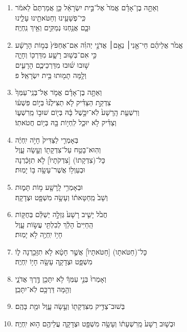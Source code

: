 \documentclass[12pt,a4paper,titlepage]{article}
\def \pslabelsep{-0.9em} %
\def \psleftmargin{0em} %
\begin{document}
\begin{enumerate}[leftmargin=\psleftmargin, labelsep = \pslabelsep, label={\arabic*}, font=\color{\pscolor}\small\textsuperscript, parsep=0em, itemsep=0em, topsep=0em ]
\item \texthebrew{וְאַתָּ֣ה בֶן־אָדָ֗ם אֱמֹר֙ אֶל־בֵּ֣ית יִשְׂרָאֵ֔ל כֵּ֤ן אֲמַרְתֶּם֙ לֵאמֹ֔ר \\ כִּֽי־פְשָׁעֵ֥ינוּ וְחַטֹּאתֵ֖ינוּ עָלֵ֑ינוּ \\ וּבָ֛ם אֲנַ֥חְנוּ נְמַקִּ֖ים וְאֵ֥יךְ נִֽחְיֶֽה׃}
\item \texthebrew{אֱמֹ֙ר אֲלֵיהֶ֜ם חַי־אָ֣נִי׀ נְאֻ֣ם׀ אֲדֹנָ֣י יְהוִ֗ה אִם־אֶחְפֹּץ֙ בְּמ֣וֹת הָרָשָׁ֔ע \\ כִּ֣י אִם־בְּשׁ֥וּב רָשָׁ֛ע מִדַּרְכּ֖וֹ וְחָיָ֑ה \\ שׁ֣וּבוּ שׁ֜וּבוּ מִדַּרְכֵיכֶ֧ם הָרָעִ֛ים \\ וְלָ֥מָּה תָמ֖וּתוּ בֵּ֥ית יִשְׂרָאֵֽל׃ פ}
\item \texthebrew{וְאַתָּ֣ה בֶן־אָדָ֗ם אֱמֹ֤ר אֶל־בְּנֵֽי־עַמְּךָ֙ \\ צִדְקַ֣ת הַצַּדִּ֗יק לֹ֤א תַצִּילֶ֙נּוּ֙ בְּי֣וֹם פִּשְׁע֔וֹ \\ וְרִשְׁעַ֤ת הָֽרָשָׁע֙ לֹֽא־יִכָּ֣שֶׁל בָּ֔הּ בְּי֖וֹם שׁוּב֣וֹ מֵֽרִשְׁע֑וֹ \\ וְצַדִּ֗יק לֹ֥א יוּכַ֛ל לִֽחְי֥וֹת בָּ֖הּ בְּי֥וֹם חֲטֹאתֽוֹ׃}
\item \texthebrew{בְּאָמְרִ֤י לַצַּדִּיק֙ חָיֹ֣ה יִֽחְיֶ֔ה \\ וְהֽוּא־בָטַ֥ח עַל־צִדְקָת֖וֹ וְעָ֣שָׂה עָ֑וֶל \\ כָּל־(צִדְקָתוֹ) [צִדְקֹתָיו֙] לֹ֣א תִזָּכַ֔רְנָה \\ וּבְעַוְל֥וֹ אֲשֶׁר־עָשָׂ֖ה בּ֥וֹ יָמֽוּת׃}
\item \texthebrew{וּבְאָמְרִ֥י לָֽרָשָׁ֖ע מ֣וֹת תָּמ֑וּת \\ וְשָׁב֙ מֵֽחַטָּאת֔וֹ וְעָשָׂ֥ה מִשְׁפָּ֖ט וּצְדָקָֽה׃}
\item \texthebrew{חֲבֹ֙ל יָשִׁ֤יב רָשָׁע֙ גְּזֵלָ֣ה יְשַׁלֵּ֔ם בְּחֻקּ֤וֹת \\ הַֽחַיִּים֙ הָלַ֔ךְ לְבִלְתִּ֖י עֲשׂ֣וֹת עָ֑וֶל \\ חָי֥וֹ יִֽחְיֶ֖ה לֹ֥א יָמֽוּת׃}
\item \texthebrew{כָּל־(חַטֹּאתָו) [חַטֹּאתָיו֙] אֲשֶׁ֣ר חָטָ֔א לֹ֥א תִזָּכַ֖רְנָה ל֑וֹ \\ מִשְׁפָּ֧ט וּצְדָקָ֛ה עָשָׂ֖ה חָי֥וֹ יִֽחְיֶֽה׃}\verseSpace
\item \texthebrew{וְאָמְרוּ֙ בְּנֵ֣י עַמְּךָ֔ לֹ֥א יִתָּכֵ֖ן דֶּ֣רֶךְ אֲדֹנָ֑י \\ וְהֵ֖מָּה דַּרְכָּ֥ם לֹֽא־יִתָּכֵֽן׃}
\item \texthebrew{בְּשׁוּב־צַדִּ֥יק מִצִּדְקָת֖וֹ וְעָ֣שָׂה עָ֑וֶל וּמֵ֖ת בָּהֶֽם׃}
\item \texthebrew{וּבְשׁ֤וּב רָשָׁע֙ מֵֽרִשְׁעָת֔וֹ וְעָשָׂ֥ה מִשְׁפָּ֖ט וּצְדָקָ֑ה עֲלֵיהֶ֖ם ה֥וּא יִֽחְיֶֽה׃}

\end{enumerate}
\end{document}
